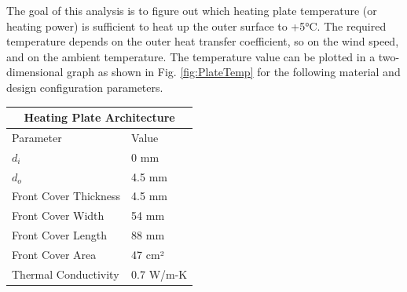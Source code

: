 The goal of this analysis is to figure out which heating plate temperature (or heating power) is sufficient to heat up the outer surface to +5°C. The required temperature depends on the outer heat transfer coefficient, so on the wind speed, and on the ambient temperature. The temperature value can be plotted in a two-dimensional graph as shown in Fig. \ref{fig:PlateTemp} for the following material and design configuration parameters. 
\begin{center}
\begin{tabular}{||l l||} 
 \hline
 \multicolumn{2}{|c|}{Heating Plate Architecture} \\
 \hline\hline
 Parameter & Value\\
 \hline\hline
 \(d_i\) & 0 mm  \\ 
 \hline
 \(d_o\) & 4.5 mm  \\ 
 \hline
 Front Cover Thickness & 4.5 mm \\
 \hline
 Front Cover Width & 54 mm  \\ 
 \hline
 Front Cover Length & 88 mm \\
 \hline
 Front Cover Area & 47 cm²  \\
 \hline
 Thermal Conductivity & 0.7 W/m-K \\ [1ex] 
 \hline
\end{tabular}
\end{center}


